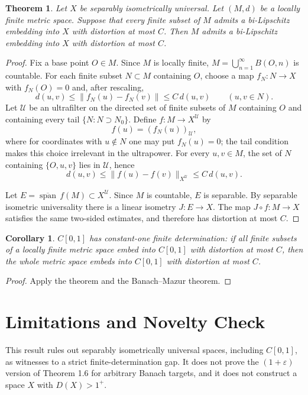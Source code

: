 \documentclass[11pt]{article}
\newtheorem{theorem}{Theorem}
\newtheorem{corollary}{Corollary}
\begin{document}
\begin{theorem}
Let $X$ be separably isometrically universal. Let $(M,d)$ be a locally finite
metric space. Suppose that every finite subset of $M$ admits a bi-Lipschitz
embedding into $X$ with distortion at most $C$. Then $M$ admits a bi-Lipschitz
embedding into $X$ with distortion at most $C$.
\end{theorem}

\begin{proof}
Fix a base point $O\in M$. Since $M$ is locally finite,
$M=\bigcup_{n=1}^\infty B(O,n)$ is countable. For each finite subset
$N\subset M$ containing $O$, choose a map $f_N:N\to X$ with $f_N(O)=0$ and,
after rescaling,
\[
  d(u,v)\leq \|f_N(u)-f_N(v)\|\leq C\,d(u,v)
  \qquad (u,v\in N).
\]
Let $\mathcal U$ be an ultrafilter on the directed set of finite subsets of
$M$ containing $O$ and containing every tail $\{N:N\supset N_0\}$. Define
$f:M\to X^{\mathcal U}$ by
\[
  f(u)=(f_N(u))_{\mathcal U},
\]
where for coordinates with $u\notin N$ one may put $f_N(u)=0$; the tail
condition makes this choice irrelevant in the ultrapower. For every
$u,v\in M$, the set of $N$ containing $\{O,u,v\}$ lies in $\mathcal U$, hence
\[
  d(u,v)\leq \|f(u)-f(v)\|_{X^{\mathcal U}}\leq C\,d(u,v).
\]

Let $E=\overline{\operatorname{span}}\, f(M)\subset X^{\mathcal U}$. Since
$M$ is countable, $E$ is separable. By separable isometric universality there
is a linear isometry $J:E\to X$. The map $J\circ f:M\to X$ satisfies the same
two-sided estimates, and therefore has distortion at most $C$.
\end{proof}

\begin{corollary}
$C[0,1]$ has constant-one finite determination: if all finite subsets of a
locally finite metric space embed into $C[0,1]$ with distortion at most $C$,
then the whole metric space embeds into $C[0,1]$ with distortion at most $C$.
\end{corollary}

\begin{proof}
Apply the theorem and the Banach--Mazur theorem.
\end{proof}

\section*{Limitations and Novelty Check}

This result rules out separably isometrically universal spaces, including
$C[0,1]$, as witnesses to a strict finite-determination gap. It does not prove
the $(1+\varepsilon)$ version of Theorem 1.6 for arbitrary Banach targets, and
it does not construct a space $X$ with $D(X)>1^+$.
\end{document}
